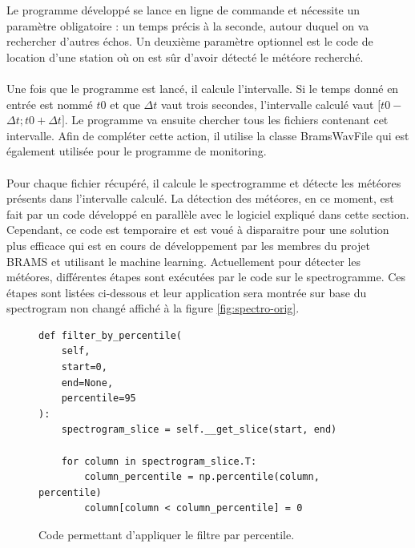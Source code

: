 \documentclass[11pt]{article}
\begin{document}
Le programme développé se lance en ligne de commande et nécessite un paramètre obligatoire : un temps précis à la seconde, autour duquel on va rechercher d'autres échos.
Un deuxième paramètre optionnel est le code de location d'une station où on est sûr d'avoir détecté le météore recherché.\\
\\
Une fois que le programme est lancé, il calcule l'intervalle.
Si le temps donné en entrée est nommé \(t0\) et que $\Delta$\(t\) vaut trois secondes, l'intervalle calculé vaut \([t0 - \)$\Delta$\(t ; t0 + \)$\Delta$\(t]\).
Le programme va ensuite chercher tous les fichiers contenant cet intervalle.
Afin de compléter cette action, il utilise la classe BramsWavFile qui est également utilisée pour le programme de monitoring.\\
\\
Pour chaque fichier récupéré, il calcule le spectrogramme et détecte les météores présents dans l'intervalle calculé.
La détection des météores, en ce moment, est fait par un code développé en parallèle avec le logiciel expliqué dans cette section.
Cependant, ce code est temporaire et est voué à disparaitre pour une solution plus efficace qui est en cours de développement par les membres du projet BRAMS et utilisant le machine learning.
Actuellement pour détecter les météores, différentes étapes sont exécutées par le code sur le spectrogramme.
Ces étapes sont listées ci-dessous et leur application sera montrée sur base du spectrogram non changé affiché à la figure \ref{fig:spectro-orig}.

\begin{figure}[h]
    \begin{lstlisting}[style=CStyle]
def filter_by_percentile(
    self,
    start=0,
    end=None,
    percentile=95
):
    spectrogram_slice = self.__get_slice(start, end)

    for column in spectrogram_slice.T:
        column_percentile = np.percentile(column, percentile)
        column[column < column_percentile] = 0
    \end{lstlisting}
    \caption{Code permettant d'appliquer le filtre par percentile.}
    \label{fig:percentile-code}
\end{figure}
\end{document}
